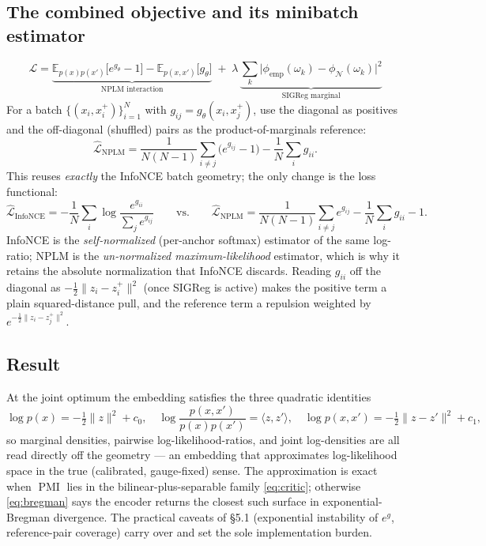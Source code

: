 \documentclass[11pt]{article}
\begin{document}
\subsection{The combined objective and its minibatch estimator}
\begin{equation}
\boxed{\;
\mathcal{L}
= \underbrace{\mathbb{E}_{p(x)p(x')}\!\big[e^{g_\theta}-1\big]
- \mathbb{E}_{p(x,x')}\big[g_\theta\big]}_{\text{NPLM interaction}}
\;+\;\lambda\,
\underbrace{\sum_k\big|\phi_{\mathrm{emp}}(\omega_k)-\phi_{\mathcal{N}}(\omega_k)\big|^2}_{\text{SIGReg marginal}}
\;}
\end{equation}
For a batch $\{(x_i,x_i^+)\}_{i=1}^N$ with $g_{ij}=g_\theta(x_i,x_j^+)$, use the
diagonal as positives and the off-diagonal (shuffled) pairs as the
product-of-marginals reference:
\begin{equation}
\widehat{\mathcal{L}}_{\mathrm{NPLM}}
= \frac{1}{N(N-1)}\sum_{i\neq j}\big(e^{g_{ij}}-1\big)
- \frac{1}{N}\sum_i g_{ii}.
\end{equation}
This reuses \emph{exactly} the InfoNCE batch geometry; the only change is the loss
functional:
\begin{equation}
\widehat{\mathcal{L}}_{\mathrm{InfoNCE}}
= -\frac1N\sum_i \log\frac{e^{g_{ii}}}{\sum_j e^{g_{ij}}}
\qquad\text{vs.}\qquad
\widehat{\mathcal{L}}_{\mathrm{NPLM}}
= \frac{1}{N(N-1)}\sum_{i\neq j}e^{g_{ij}} - \frac1N\sum_i g_{ii} - 1.
\end{equation}
InfoNCE is the \emph{self-normalized} (per-anchor softmax) estimator of the same
log-ratio; NPLM is the \emph{un-normalized maximum-likelihood} estimator, which is
why it retains the absolute normalization that InfoNCE discards. Reading $g_{ii}$
off the diagonal as $-\tfrac12\|z_i-z_i^+\|^2$ (once SIGReg is active) makes the
positive term a plain squared-distance pull, and the reference term a repulsion
weighted by $e^{-\frac12\|z_i-z_j^+\|^2}$.

\subsection{Result}
At the joint optimum the embedding satisfies the three quadratic identities
\begin{equation}
\log p(x) = -\tfrac12\|z\|^2 + c_0,\quad
\log\frac{p(x,x')}{p(x)p(x')} = \langle z,z'\rangle,\quad
\log p(x,x') = -\tfrac12\|z-z'\|^2 + c_1,
\end{equation}
so marginal densities, pairwise log-likelihood-ratios, and joint log-densities are
all read directly off the geometry --- an embedding that approximates
log-likelihood space in the true (calibrated, gauge-fixed) sense. The
approximation is exact when $\operatorname{PMI}$ lies in the bilinear-plus-separable
family \eqref{eq:critic}; otherwise \eqref{eq:bregman} says the encoder returns the
closest such surface in exponential-Bregman divergence. The practical caveats of
\S5.1 (exponential instability of $e^{g}$, reference-pair coverage) carry over and
set the sole implementation burden.
\end{document}
